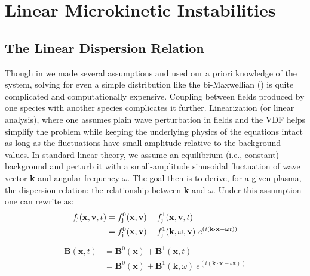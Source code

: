     \section{Linear Microkinetic Instabilities} \label{sec:instab}

        \subsection{The Linear Dispersion Relation} \label{sec:dpr}
 
            Though in  we made several assumptions and used our a priori knowledge of
            the system, solving  for even a simple distribution like the bi-Maxwellian
            () is quite complicated and computationally expensive. Coupling between
            fields produced by one species with another species complicates it further.
            Linearization (or linear analysis), where one assumes plain wave perturbation in fields
            and the VDF helps simplify the problem while keeping the underlying physics of the
            equations intact as long as the fluctuations have small amplitude relative to the
            background values. In standard linear theory, we assume an equilibrium (i.e., constant)
            background and perturb it with a small-amplitude sinusoidal fluctuation of wave vector
            \textbf{k} and angular frequency $\omega$. The goal then is to derive, for a given
            plasma, the dispersion relation: the relationship between \textbf{k} and $\omega$. Under
            this assumption one can rewrite  as:
            \begin{align}
                \begin{split}
                    \mathnormal{f}_{\rm j}(\mathbf{x}, \mathbf{v}, t) & = \mathnormal{f}_{\rm j}^0(\mathbf{x}, \mathbf{v}) + \mathnormal{f}_{\rm j}^1(\mathbf{x}, \mathbf{v}, t)\\
                    & = \mathnormal{f}_{\rm j}^0(\mathbf{x}, \mathbf{v}) + \mathnormal{f}_{\rm j}^1(\mathbf{k}, \omega, \mathbf{v})~e^{(i(\mathbf{k}\cdot \mathbf{x} -\omega t))}\label{eq:vdfn1}
                \end{split}
            \end{align}
            \vspace{-0.4cm}
            \begin{align}
                \begin{split}
                    \mathbf{B}(\mathbf{x}, t) & = \mathbf{B}^0(\mathbf{x}) + \mathbf{B}^1(\mathbf{x}, t)\\
                    & = \mathbf{B}^0(\mathbf{x}) + \mathbf{B}^1(\mathbf{k},\omega)~e^{(i(\mathbf{k}\cdot \mathbf{x} -\omega t))}\label{eq:mag1}
                \end{split}
            \end{align}
